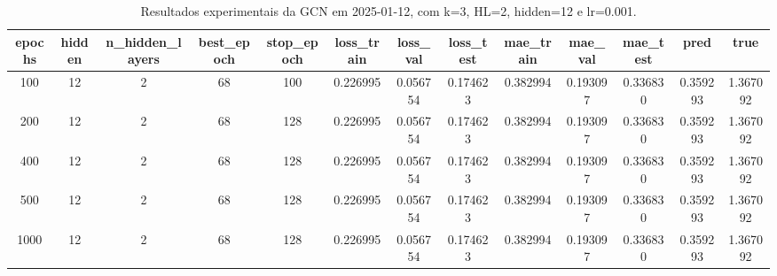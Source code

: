 \begin{table}[h]
\centering
\caption{Resultados experimentais da GCN em 2025-01-12, com k=3, HL=2, hidden=12 e lr=0.001.}
\label{tab:gcn_results_k3_hl2_h12_d20250112}
\begin{tabular}{ccccccccccccc}
\toprule
epochs & hidden & n\_hidden\_layers & best\_epoch & stop\_epoch & loss\_train & loss\_val & loss\_test & mae\_train & mae\_val & mae\_test & pred & true \\
\midrule
100 & 12 & 2 & 68 & 100 & 0.226995 & 0.056754 & 0.174623 & 0.382994 & 0.193097 & 0.336830 & 0.359293 & 1.367092 \\
200 & 12 & 2 & 68 & 128 & 0.226995 & 0.056754 & 0.174623 & 0.382994 & 0.193097 & 0.336830 & 0.359293 & 1.367092 \\
400 & 12 & 2 & 68 & 128 & 0.226995 & 0.056754 & 0.174623 & 0.382994 & 0.193097 & 0.336830 & 0.359293 & 1.367092 \\
500 & 12 & 2 & 68 & 128 & 0.226995 & 0.056754 & 0.174623 & 0.382994 & 0.193097 & 0.336830 & 0.359293 & 1.367092 \\
1000 & 12 & 2 & 68 & 128 & 0.226995 & 0.056754 & 0.174623 & 0.382994 & 0.193097 & 0.336830 & 0.359293 & 1.367092 \\
\bottomrule
\end{tabular}
\end{table}
